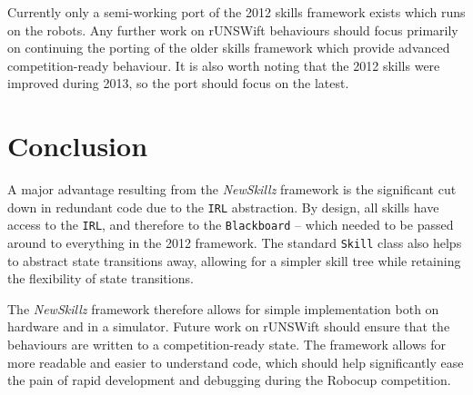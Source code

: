 Currently only a semi-working port of the 2012 skills framework exists which runs on the robots. Any further work on rUNSWift behaviours should focus primarily on continuing the porting of the older skills framework which provide advanced competition-ready behaviour. It is also worth noting that the 2012 skills were improved during 2013, so the port should focus on the latest.

\section{Conclusion}

A major advantage resulting from the \textit{NewSkillz} framework is the significant cut down in redundant code due to the \texttt{IRL} abstraction. By design, all skills have access to the \texttt{IRL}, and therefore to the \texttt{Blackboard} -- which needed to be passed around to everything in the 2012 framework. The standard \texttt{Skill} class also helps to abstract state transitions away, allowing for a simpler skill tree while retaining the flexibility of state transitions.

The \textit{NewSkillz} framework therefore allows for simple implementation both on hardware and in a simulator. Future work on rUNSWift should ensure that the behaviours are written to a competition-ready state. The framework allows for more readable and easier to understand code, which should help significantly ease the pain of rapid development and debugging during the Robocup competition.

